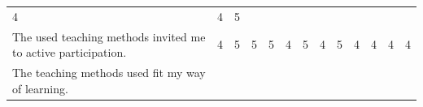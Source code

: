 \documentclass[paper=a4,justified,a4paper]{tufte-handout}
\begin{document}
\begin{longtable}[]{@{}lllllllllllll@{}}
\begin{minipage}[t]{0.07\columnwidth}
4\strut
\end{minipage} & \begin{minipage}[t]{0.07\columnwidth}\raggedright
4\strut
\end{minipage} & \begin{minipage}[t]{0.07\columnwidth}\raggedright
5\strut
\end{minipage}\tabularnewline
\begin{minipage}[t]{0.07\columnwidth}\raggedright
\scriptsize The used teaching methods invited me to active
participation.\strut
\end{minipage} & \begin{minipage}[t]{0.04\columnwidth}\raggedright
4\strut
\end{minipage} & \begin{minipage}[t]{0.04\columnwidth}\raggedright
5\strut
\end{minipage} & \begin{minipage}[t]{0.04\columnwidth}\raggedright
5\strut
\end{minipage} & \begin{minipage}[t]{0.04\columnwidth}\raggedright
5\strut
\end{minipage} & \begin{minipage}[t]{0.04\columnwidth}\raggedright
4\strut
\end{minipage} & \begin{minipage}[t]{0.04\columnwidth}\raggedright
5\strut
\end{minipage} & \begin{minipage}[t]{0.04\columnwidth}\raggedright
4\strut
\end{minipage} & \begin{minipage}[t]{0.04\columnwidth}\raggedright
5\strut
\end{minipage} & \begin{minipage}[t]{0.07\columnwidth}\raggedright
4\strut
\end{minipage} & \begin{minipage}[t]{0.07\columnwidth}\raggedright
4\strut
\end{minipage} & \begin{minipage}[t]{0.07\columnwidth}\raggedright
4\strut
\end{minipage} & \begin{minipage}[t]{0.07\columnwidth}\raggedright
4\strut
\end{minipage}\tabularnewline
\begin{minipage}[t]{0.07\columnwidth}\raggedright
\scriptsize The teaching methods used fit my way of learning.\strut

\end{minipage}
\end{longtable}
\end{document}
